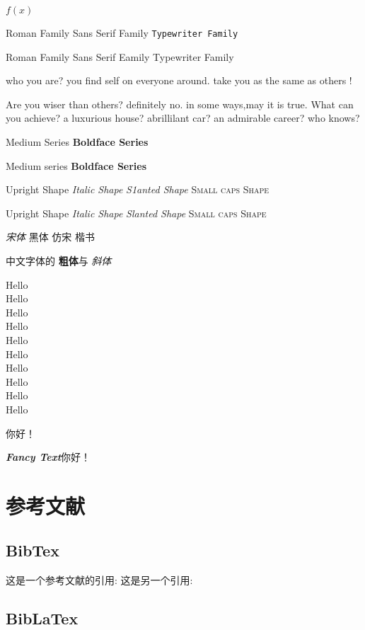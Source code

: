 \documentclass[12pt]{article} %
\newcommand{\myfont}{\textit{\textbf{\textsf{Fancy Text}}}}
\begin{document}
	$f(x)$
	
	\textrm{Roman Family} \textsf{Sans Serif Family}
	\texttt{Typewriter Family}
	
	{\rmfamily Roman Family} {\sffamily Sans Serif Eamily} 
	{\ttfamily Typewriter Family}
	
	{\sffamily who you are? you find self on everyone around. take you as the same as others !}
	
	{\ttfamily Are you wiser than others? definitely no. in some ways,may it is true. What can you achieve? a luxurious house? abrillilant car? an admirable career? who knows?}
	
	\textmd{Medium Series} \textbf{Boldface Series}
		
	{\mdseries Medium series} {\bfseries Boldface Series}
	
	\textup{Upright Shape} 
	\textit{Italic Shape}
	\textsl{S1anted Shape} 
	\textsc{Small caps Shape}
	
	{\upshape Upright Shape} 
	{\itshape Italic Shape} 
	{\slshape Slanted Shape} 
	{\scshape Small caps Shape}
	
	{\songti\it 宋体} \quad 
	{\heiti 黑体}  \quad 
	{\fangsong 仿宋}\quad 
	{\kaishu 楷书}
	
	中文字体的 \textbf{粗体}与 \textit{斜体}
	
	{\tiny	       Hello}\\
	{\scriptsize   Hello}\\
	{\footnotesize Hello}\\
	{\small        Hello}\\
	{\normalsize   Hello}\\
	{\large        Hello}\\
	{\Large        Hello}\\
	{\LARGE        Hello}\\
	{\huge         Hello}\\
	{\Huge         Hello}

	 你好！
	
	{\myfont 你好！}
	
	
	\section{参考文献}
	\subsection{BibTex}
	这是一个参考文献的引用: \cite{1}
	这是另一个引用: \cite{付盼盼2021疫情背景下线上教学在计算机辅助产品设计中的应用研究}
		
	
	
	
	
	
		\subsection{BibLaTex}
	
	
	
\end{document}
